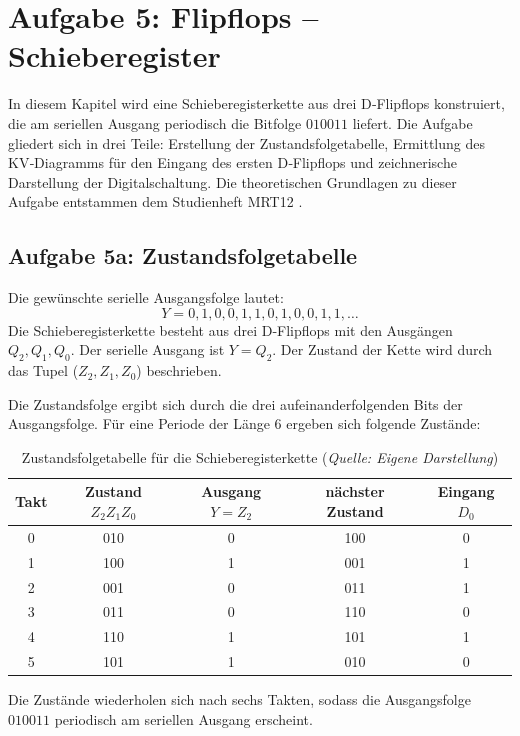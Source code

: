 

\section{Aufgabe 5: Flipflops – Schieberegister}
In diesem Kapitel wird eine Schieberegisterkette aus drei D‑Flipflops konstruiert, die am seriellen Ausgang periodisch die Bitfolge \(010011\) liefert.  
Die Aufgabe gliedert sich in drei Teile: Erstellung der Zustandsfolgetabelle, Ermittlung des KV‑Diagramms für den Eingang des ersten D‑Flipflops und zeichnerische Darstellung der Digitalschaltung.
Die theoretischen Grundlagen zu dieser Aufgabe entstammen dem Studienheft MRT12 \cite{2}.
\subsection{Aufgabe 5a: Zustandsfolgetabelle}
Die gewünschte serielle Ausgangsfolge lautet: \hspace{4cm} \[Y = 0, 1, 0, 0, 1, 1, 0, 1, 0, 0, 1, 1, \dots\]
Die Schieberegisterkette besteht aus drei D‑Flipflops mit den Ausgängen \(Q_2, Q_1, Q_0\).  
Der serielle Ausgang ist \(Y = Q_2\).  
Der Zustand der Kette wird durch das Tupel (\(\mathit{Z}_2, \mathit{Z}_1, \mathit{Z}_0\)) beschrieben.

Die Zustandsfolge ergibt sich durch die drei aufeinanderfolgenden Bits der Ausgangsfolge.  
Für eine Periode der Länge 6 ergeben sich folgende Zustände:
\begin{table}[h]
\centering
\begin{tabular}{c|c|c|c|c}
\toprule
\textbf{Takt} & \textbf{Zustand \(Z_2 Z_1 Z_0\)} & \textbf{Ausgang \(Y = Z_2\)} & \textbf{nächster Zustand} & \textbf{Eingang \(D_0\)} \\
\midrule
0 & 010 & 0 & 100 & 0 \\
1 & 100 & 1 & 001 & 1 \\
2 & 001 & 0 & 011 & 1 \\
3 & 011 & 0 & 110 & 0 \\
4 & 110 & 1 & 101 & 1 \\
5 & 101 & 1 & 010 & 0 \\
\bottomrule
\end{tabular}
\caption{Zustandsfolgetabelle für die Schieberegisterkette (\textit{Quelle: Eigene Darstellung})}
\label{tab:schieberegister_zustaende}
\end{table}
Die Zustände wiederholen sich nach sechs Takten, sodass die Ausgangsfolge \(010011\) periodisch am seriellen Ausgang erscheint.
